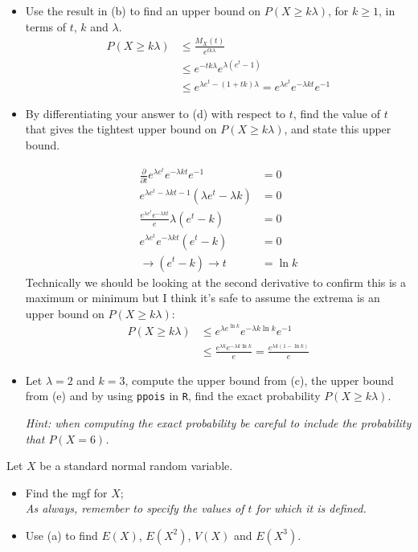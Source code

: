 \documentclass{article}
\newcommand{\1}{\mathbf{1}}
\begin{document}
\begin{itemize}
    \item[d.] Use the result in (b) to find an upper bound on $P(X \geq k\lambda)$, for $k\geq 1$, in terms of $t$, $k$ and $\lambda$.
    \begin{align*}
        P(X \geq k\lambda ) &\leq \frac{M_X(t)}{e^{tk\lambda}} \\
        &\leq e^{-tk\lambda} e^{\lambda(e^t-1)} \\
        &\leq e^{\lambda e^t-(1+tk)\lambda} = e^{\lambda e^t}e^{-\lambda kt}e^{-1}
    \end{align*}
    
    \newpage
    \item[e.] By differentiating your answer to {\color{blue}(d)} with respect to $t$, find the value of $t$ that gives the tightest upper bound on $P(X \geq k\lambda)$, and state this upper bound.
    
    \begin{align*}
        \frac{\partial}{\partial t} e^{\lambda e^t}e^{-\lambda kt}e^{-1} &= 0 \\
        e^{\lambda e^t - \lambda k t - 1}(\lambda e^t - \lambda k) &= 0 \\
        \frac{e^{\lambda e^t}e^{-\lambda kt}}{e} \lambda (e^t - k) &= 0 \\
        e^{\lambda e^t}e^{-\lambda kt} (e^t - k) &= 0 \\
        \rightarrow (e^t - k)  \rightarrow t &= \ln k
    \end{align*}
    Technically we should be looking at the second derivative to confirm this is a maximum or minimum but I think it's safe to assume the extrema is an upper bound on $P(X \geq k\lambda)$:
    \begin{align*}
        P(X \geq k\lambda) &\leq e^{\lambda e^{\ln k}}e^{-\lambda k\ln k}e^{-1} \\
        &\leq \frac{e^{\lambda k}e^{-\lambda k\ln k}}{e} = \frac{e^{\lambda k(1-\ln k)}}{e}
    \end{align*}
    
    \item[f.] Let $\lambda=2$ and $k=3$, compute the upper bound from (c), the upper bound from (e) and by using {\tt ppois} in {\tt R}, find the exact probability $P(X \geq k\lambda)$.\par
    {\it Hint: when computing the exact probability be careful to include the probability that $P(X=6)$.}
    
    
\end{itemize}



\item[8.] 
Let $X$ be a standard normal random variable.
\begin{itemize}
\item[(a)] Find the mgf for $X$;\\
{\it As always, remember to specify the values of $t$ for which it is defined.}
\item[(b)] Use (a) to find $E(X)$, $E(X^2)$, $V(X)$ and $E(X^3)$.
\end{itemize}
\end{document}
